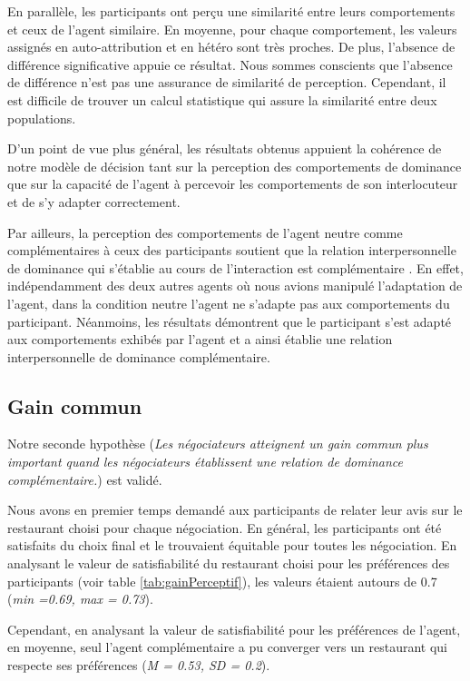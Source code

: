	En parallèle, les participants ont perçu une similarité entre leurs comportements et ceux de l'agent similaire. En moyenne, pour chaque comportement, les valeurs assignés en auto-attribution et en hétéro sont très proches. De plus, l'absence de différence significative appuie ce résultat. Nous sommes conscients que l'absence de différence n'est pas une assurance de similarité de perception. Cependant, il est difficile de trouver un calcul statistique qui assure la similarité entre deux populations.
	
	D’un point de vue plus général, les résultats obtenus appuient la cohérence de notre modèle de décision tant sur la perception des comportements de dominance que sur la capacité de l'agent à percevoir les comportements de son interlocuteur et de s'y adapter correctement.  
	
	Par ailleurs, la perception des comportements de l'agent neutre comme complémentaires à ceux des participants soutient que la relation interpersonnelle de dominance qui s'établie au cours de l'interaction est complémentaire \cite{burgoonnonverbal}. En effet, indépendamment des deux autres agents où nous avions manipulé l'adaptation de l'agent, dans la condition neutre l'agent ne s'adapte pas aux comportements du participant. Néanmoins, les résultats démontrent que le participant s'est adapté aux comportements exhibés par l'agent et a ainsi établie une relation interpersonnelle de dominance complémentaire.
	
	\subsection{Gain commun}
	Notre seconde hypothèse (\textit{Les négociateurs atteignent un gain commun plus important quand les négociateurs établissent une relation de dominance complémentaire.}) est validé. 
	
	Nous avons en premier temps demandé aux participants de relater leur avis sur le restaurant choisi pour chaque négociation.
	En général, les participants ont été satisfaits du choix final et le trouvaient équitable pour toutes les négociation. 
	En analysant le valeur de satisfiabilité du restaurant choisi pour les préférences des participants (voir table \ref{tab:gainPerceptif}), les valeurs étaient autours de 0.7 (\emph{min =0.69, max = 0.73}). 
	
	Cependant, en analysant la valeur de satisfiabilité pour les préférences de l'agent,  en moyenne, seul l'agent complémentaire a pu converger vers un restaurant qui respecte ses préférences (\emph{M = 0.53, SD = 0.2}). 
	
